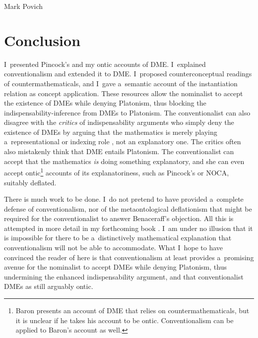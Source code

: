 \begin{artengenv}{Mark Povich}
\section{Conclusion}
I~presented Pincock's
\parencite*[][]{pincock_abstract_2015} %
 and my 
\parencite[][]{povich_narrow_2021} %
 ontic accounts of DME. I~explained conventionalism and extended it to DME. I~proposed counterconceptual readings of countermathematicals, and I~gave a~semantic account of the instantiation relation as concept application. These resources allow the nominalist to accept the existence of DMEs while denying Platonism, thus blocking the indispensability-inference from DMEs to Platonism. The conventionalist can also disagree with the \textit{critics} of indispensability arguments who simply deny the existence of DMEs by arguing that the mathematics is merely playing a~representational 
\parencite[][]{saatsi_enhanced_2011} %
 or indexing role 
\parencite[][]{melia_weaseling_2000}, %
 not an explanatory one. The critics often also mistakenly think that DME entails Platonism. The conventionalist can accept that the mathematics \textit{is} doing something explanatory, and she can even accept ontic\footnote{Baron 
\parencite*[][]{baron_counterfactual_2020} %
 presents an account of DME that relies on countermathematicals, but it is unclear if he takes his account to be ontic. Conventionalism can be applied to Baron's account as well.} accounts of its explanatoriness, such as Pincock's or NOCA, suitably deflated.

There is much work to be done. I~do not pretend to have provided a~complete defense of conventionalism, nor of the metaontological deflationism that might be required for the conventionalist to answer Benaceraff's objection. All this is attempted in more detail in my forthcoming book
\parencite[][]{povich_rules_2024}. %
 I~am under no illusion that it is impossible for there to be a~distinctively mathematical explanation that conventionalism will not be able to accommodate. What I~hope to have convinced the reader of here is that conventionalism at least provides a~promising avenue for the nominalist to accept DMEs while denying Platonism, thus undermining the enhanced indispensability argument, and that conventionalist DMEs as still arguably ontic.
 
 
 
 
 
 
\end{artengenv}